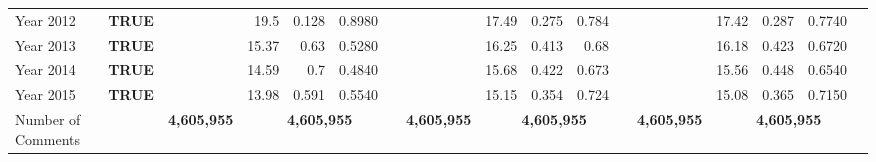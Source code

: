 \documentclass[letterpaper]{article}
\begin{document}
\begin{table*}
\begin{threeparttable}
\begin{adjustbox}{max width=\textwidth}
\begin{tabular}{|p{3.5cm}|c|cccc|cccc|cccc|cccc|cccc|cccc|}
    Year 2012 & \multicolumn{1}{l|}{\textbf{TRUE}} & \multicolumn{1}{r|}{} & \multicolumn{1}{r|}{} & \multicolumn{1}{r|}{} &       & \multicolumn{1}{r|}{19.5} & \multicolumn{1}{r|}{0.128} & \multicolumn{1}{r|}{0.8980} &       & \multicolumn{1}{r|}{} & \multicolumn{1}{r|}{} & \multicolumn{1}{r|}{} &       & \multicolumn{1}{r|}{17.49} & \multicolumn{1}{r|}{0.275} & \multicolumn{1}{r|}{0.784} &       & \multicolumn{1}{r|}{} & \multicolumn{1}{r|}{} & \multicolumn{1}{r|}{} &       & \multicolumn{1}{r|}{17.42} & \multicolumn{1}{r|}{0.287} & \multicolumn{1}{r|}{0.7740} &  \\
    Year 2013 & \multicolumn{1}{l|}{\textbf{TRUE}} & \multicolumn{1}{r|}{} & \multicolumn{1}{r|}{} & \multicolumn{1}{r|}{} &       & \multicolumn{1}{r|}{15.37} & \multicolumn{1}{r|}{0.63} & \multicolumn{1}{r|}{0.5280} &       & \multicolumn{1}{r|}{} & \multicolumn{1}{r|}{} & \multicolumn{1}{r|}{} &       & \multicolumn{1}{r|}{16.25} & \multicolumn{1}{r|}{0.413} & \multicolumn{1}{r|}{0.68} &       & \multicolumn{1}{r|}{} & \multicolumn{1}{r|}{} & \multicolumn{1}{r|}{} &       & \multicolumn{1}{r|}{16.18} & \multicolumn{1}{r|}{0.423} & \multicolumn{1}{r|}{0.6720} &  \\
    Year 2014 & \multicolumn{1}{l|}{\textbf{TRUE}} & \multicolumn{1}{r|}{} & \multicolumn{1}{r|}{} & \multicolumn{1}{r|}{} &       & \multicolumn{1}{r|}{14.59} & \multicolumn{1}{r|}{0.7} & \multicolumn{1}{r|}{0.4840} &       & \multicolumn{1}{r|}{} & \multicolumn{1}{r|}{} & \multicolumn{1}{r|}{} &       & \multicolumn{1}{r|}{15.68} & \multicolumn{1}{r|}{0.422} & \multicolumn{1}{r|}{0.673} &       & \multicolumn{1}{r|}{} & \multicolumn{1}{r|}{} & \multicolumn{1}{r|}{} &       & \multicolumn{1}{r|}{15.56} & \multicolumn{1}{r|}{0.448} & \multicolumn{1}{r|}{0.6540} &  \\
    Year 2015 & \multicolumn{1}{l|}{\textbf{TRUE}} & \multicolumn{1}{r|}{} & \multicolumn{1}{r|}{} & \multicolumn{1}{r|}{} &       & \multicolumn{1}{r|}{13.98} & \multicolumn{1}{r|}{0.591} & \multicolumn{1}{r|}{0.5540} &       & \multicolumn{1}{r|}{} & \multicolumn{1}{r|}{} & \multicolumn{1}{r|}{} &       & \multicolumn{1}{r|}{15.15} & \multicolumn{1}{r|}{0.354} & \multicolumn{1}{r|}{0.724} &       & \multicolumn{1}{r|}{} & \multicolumn{1}{r|}{} & \multicolumn{1}{r|}{} &       & \multicolumn{1}{r|}{15.08} & \multicolumn{1}{r|}{0.365} & \multicolumn{1}{r|}{0.7150} &  \\\hline
    \midrule
    Number of Comments &       & \multicolumn{4}{c|}{\textbf{4,605,955}} & \multicolumn{4}{c|}{\textbf{4,605,955}} & \multicolumn{4}{c|}{\textbf{4,605,955}} & \multicolumn{4}{c|}{\textbf{4,605,955}} & \multicolumn{4}{c|}{\textbf{4,605,955}} & \multicolumn{4}{c|}{\textbf{4,605,955}} \\\hline

\end{tabular}
\end{adjustbox}
\end{threeparttable}
\end{table*}
\end{document}
